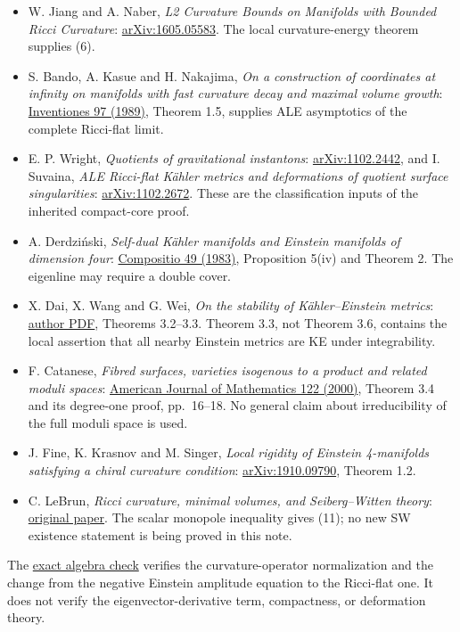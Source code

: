 \documentclass[
  11pt,
]{article}
\providecommand{\tightlist}{%
  \setlength{\itemsep}{0pt}\setlength{\parskip}{0pt}}
\begin{document}
\begin{itemize}
\tightlist
\item
  W. Jiang and A. Naber, \emph{L2 Curvature Bounds on Manifolds with
  Bounded Ricci Curvature}:
  \href{https://arxiv.org/abs/1605.05583}{arXiv:1605.05583}. The local
  curvature-energy theorem supplies (6).
\item
  S. Bando, A. Kasue and H. Nakajima, \emph{On a construction of
  coordinates at infinity on manifolds with fast curvature decay and
  maximal volume growth}:
  \href{https://doi.org/10.1007/BF01389045}{Inventiones 97 (1989)},
  Theorem 1.5, supplies ALE asymptotics of the complete Ricci-flat
  limit.
\item
  E. P. Wright, \emph{Quotients of gravitational instantons}:
  \href{https://arxiv.org/abs/1102.2442}{arXiv:1102.2442}, and I.
  Suvaina, \emph{ALE Ricci-flat Kähler metrics and deformations of
  quotient surface singularities}:
  \href{https://arxiv.org/abs/1102.2672}{arXiv:1102.2672}. These are the
  classification inputs of the inherited compact-core proof.
\item
  A. Derdziński, \emph{Self-dual Kähler manifolds and Einstein manifolds
  of dimension four}:
  \href{https://www.numdam.org/article/CM_1983__49_3_405_0.pdf}{Compositio
  49 (1983)}, Proposition 5(iv) and Theorem 2. The eigenline may require
  a double cover.
\item
  X. Dai, X. Wang and G. Wei, \emph{On the stability of Kähler--Einstein
  metrics}: \href{https://web.math.ucsb.edu/~wei/paper/dww3.pdf}{author
  PDF}, Theorems 3.2--3.3. Theorem 3.3, not Theorem 3.6, contains the
  local assertion that all nearby Einstein metrics are KE under
  integrability.
\item
  F. Catanese, \emph{Fibred surfaces, varieties isogenous to a product
  and related moduli spaces}:
  \href{https://www.mathe8.uni-bayreuth.de/de/team/prof-fabrizio-catanese-old/pdf/066.pdf}{American
  Journal of Mathematics 122 (2000)}, Theorem 3.4 and its degree-one
  proof, pp.~16--18. No general claim about irreducibility of the full
  moduli space is used.
\item
  J. Fine, K. Krasnov and M. Singer, \emph{Local rigidity of Einstein
  4-manifolds satisfying a chiral curvature condition}:
  \href{https://arxiv.org/abs/1910.09790}{arXiv:1910.09790}, Theorem
  1.2.
\item
  C. LeBrun, \emph{Ricci curvature, minimal volumes, and Seiberg--Witten
  theory}: \href{https://arxiv.org/abs/math/0003068}{original paper}.
  The scalar monopole inequality gives (11); no new SW existence
  statement is being proved in this note.
\end{itemize}

The \href{check_allowed_mode_algebra.py}{exact algebra check} verifies
the curvature-operator normalization and the change from the negative
Einstein amplitude equation to the Ricci-flat one. It does not verify
the eigenvector-derivative term, compactness, or deformation theory.
\end{document}
